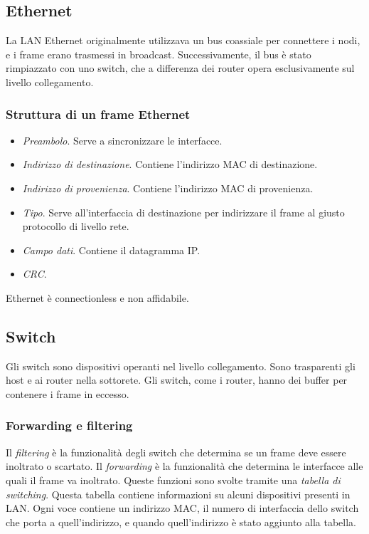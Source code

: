 \documentclass[11pt]{book}
\begin{document}
\subsection{Ethernet}
La LAN Ethernet originalmente utilizzava un bus coassiale per connettere i nodi, e i frame erano trasmessi in broadcast.
Successivamente, il bus è stato rimpiazzato con uno switch, che a differenza dei router opera esclusivamente sul livello collegamento.
\subsubsection{Struttura di un frame Ethernet} 
\begin{itemize}
    \item \textit{Preambolo}. Serve a sincronizzare le interfacce.
    \item \textit{Indirizzo di destinazione}. Contiene l'indirizzo MAC di destinazione.
    \item \textit{Indirizzo di provenienza}. Contiene l'indirizzo MAC di provenienza.
    \item \textit{Tipo}. Serve all'interfaccia di destinazione per indirizzare il frame al giusto protocollo di livello rete.
    \item \textit{Campo dati}. Contiene il datagramma IP.
    \item \textit{CRC}.
\end{itemize}
Ethernet è connectionless e non affidabile. 
\subsection{Switch}
Gli switch sono dispositivi operanti nel livello collegamento. Sono trasparenti gli host e ai router nella sottorete. Gli switch, 
come i router, hanno dei buffer per contenere i frame in eccesso.
\subsubsection{Forwarding e filtering}
Il \textit{filtering} è la funzionalità degli switch che determina se un frame deve essere inoltrato o scartato. Il 
\textit{forwarding} è la funzionalità che determina le interfacce alle quali il frame va inoltrato. Queste funzioni sono 
svolte tramite una \textit{tabella di switching}. Questa tabella contiene informazioni su alcuni dispositivi presenti in 
LAN. Ogni voce contiene un indirizzo MAC, il numero di interfaccia dello switch che porta a quell'indirizzo, e quando 
quell'indirizzo è stato aggiunto alla tabella.
\end{document}
